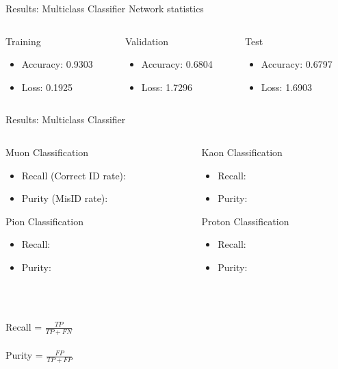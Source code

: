 \documentclass[10pt,handout]{beamer}
\begin{document}
\begin{frame}{Results: Multiclass Classifier}
Network statistics \\
\quad \quad
\begin{columns}
\begin{column}{0.3\textwidth}
Training
\begin{itemize}
\small
\item Accuracy: 0.9303
\item Loss: 0.1925
\end{itemize}
\end{column}
\begin{column}{0.3\textwidth}
Validation
\begin{itemize}
\small
\item Accuracy: 0.6804
\item Loss: 1.7296
\end{itemize}
\end{column}
\begin{column}{0.3\textwidth}
Test
\begin{itemize}
\small
\item Accuracy: 0.6797
\item Loss: 1.6903
\end{itemize}
\end{column}
\end{columns}
\end{frame}

\begin{frame}{Results: Multiclass Classifier}
\begin{columns}
\begin{column}{0.5\textwidth}
Muon Classification
\begin{itemize}
\item Recall (Correct ID rate): 
\item Purity (MisID rate): 
\end{itemize}
Pion Classification
\begin{itemize}
\item Recall: 
\item Purity: 
\end{itemize}
\end{column}
\begin{column}{0.5\textwidth}
Kaon Classification
\begin{itemize}
\item Recall: 
\item Purity: 
\end{itemize}
Proton Classification
\begin{itemize}
\item Recall: 
\item Purity: 
\end{itemize}
\end{column}
\end{columns}

\quad  \\
\quad  \\
Recall = $\frac{TP}{TP+FN}$ \\
\quad \\
Purity = $\frac{FP}{TP+FP}$
\end{frame}
\end{document}
